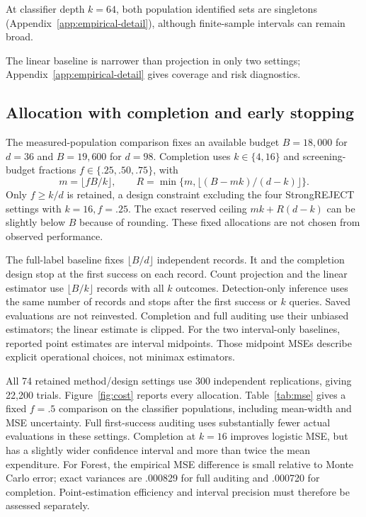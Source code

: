 \documentclass[conference]{IEEEtran}
\begin{document}
At classifier depth $k=64$, both population identified sets are singletons (Appendix~\ref{app:empirical-detail}), although finite-sample intervals can remain broad.

The linear baseline is narrower than projection in only two settings; Appendix~\ref{app:empirical-detail} gives coverage and risk diagnostics.

\subsection{Allocation with completion and early stopping}
The measured-population comparison fixes an available budget $B=18{,}000$ for $d=36$ and $B=19{,}600$ for $d=98$. Completion uses $k\in\{4,16\}$ and screening-budget fractions $f\in\{.25,.50,.75\}$, with
\[
 m=\lfloor fB/k\rfloor,\qquad
 R=\min\{m,\lfloor(B-mk)/(d-k)\rfloor\}.
\]
Only $f\geq k/d$ is retained, a design constraint excluding the four StrongREJECT settings with $k=16,f=.25$. The exact reserved ceiling $mk+R(d-k)$ can be slightly below $B$ because of rounding. These fixed allocations are not chosen from observed performance.

The full-label baseline fixes $\lfloor B/d\rfloor$ independent records. It and the completion design stop at the first success on each record. Count projection and the linear estimator use $\lfloor B/k\rfloor$ records with all $k$ outcomes. Detection-only inference uses the same number of records and stops after the first success or $k$ queries. Saved evaluations are not reinvested. Completion and full auditing use their unbiased estimators; the linear estimate is clipped. For the two interval-only baselines, reported point estimates are interval midpoints. Those midpoint MSEs describe explicit operational choices, not minimax estimators.

All 74 retained method/design settings use 300 independent replications, giving 22,200 trials. Figure~\ref{fig:cost} reports every allocation. Table~\ref{tab:mse} gives a fixed $f=.5$ comparison on the classifier populations, including mean-width and MSE uncertainty. Full first-success auditing uses substantially fewer actual evaluations in these settings. Completion at $k=16$ improves logistic MSE, but has a slightly wider confidence interval and more than twice the mean expenditure. For Forest, the empirical MSE difference is small relative to Monte Carlo error; exact variances are .000829 for full auditing and .000720 for completion. Point-estimation efficiency and interval precision must therefore be assessed separately.
\end{document}
